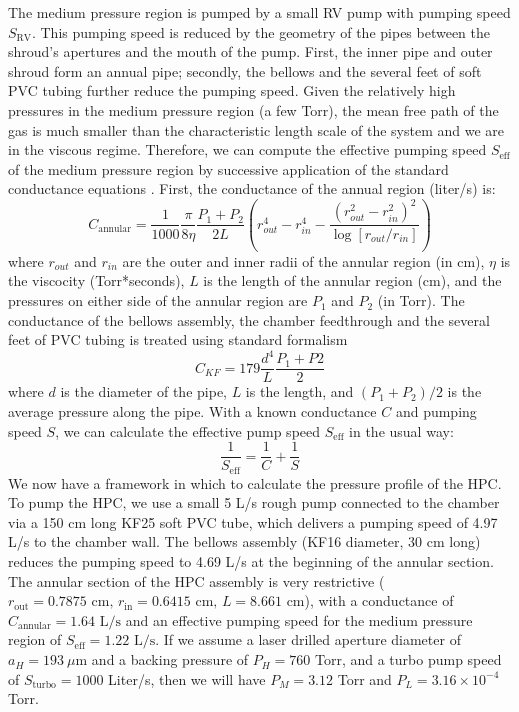 The medium pressure region is pumped by a small RV pump with pumping speed $S_{\textrm{RV}}$. This pumping speed is reduced by the geometry of the pipes between the shroud's apertures and the mouth of the pump. First, the inner pipe and outer shroud form an annual pipe; secondly, the bellows and the several feet of soft PVC tubing further reduce the pumping speed. Given the relatively high pressures in the medium pressure region (a few Torr), the mean free path of the gas is much smaller than the characteristic length scale of the system and we are in the viscous regime. Therefore, we can compute the effective pumping speed $S_{\textrm{eff}}$ of the medium pressure region by successive application of the standard conductance equations \cite{hablanianHighvacuumTechnologyPractical1997,hoffmanHandbookVacuumScience1998}. First, the conductance of the annual region (liter/s) is:
\begin{equation}
C_{\textrm{annular}} = \frac{1}{1000} \frac{\pi}{8 \eta} \frac{P_1 + P_2}{2 L} \left( r_{out}^4 - r_{in}^4 - \frac{(r_{out}^2 - r_{in}^2)^2}{\log \left[r_{out}/r_{in}\right]} \right)
\end{equation}
where $r_{out}$ and $r_{in}$ are the outer and inner radii of the annular region (in cm), $\eta$ is the viscocity (Torr*seconds), $L$ is the length of the annular region (cm), and the pressures on either side of the annular region are $P_1$ and $P_2$ (in Torr). The conductance of the bellows assembly, the chamber feedthrough and the several feet of PVC tubing is treated using standard formalism
\begin{equation}
C_{KF} = 179 \frac{d^4}{L} \frac{P_1 + P2}{2}
\end{equation}
where $d$ is the diameter of the pipe, $L$ is the length, and $(P_1 + P_2)/2$ is the average pressure along the pipe. With a known conductance $C$ and pumping speed $S$, we can calculate the effective pump speed $S_{\textrm{eff}}$ in the usual way:
\begin{equation}
\frac{1}{S_{\textrm{eff}}} = \frac{1}{C} + \frac{1}{S}
\end{equation}
We now have a framework in which to calculate the pressure profile of the HPC. To pump the HPC, we use a small 5 L/s rough pump connected to the chamber via a 150 cm long KF25 soft PVC tube, which delivers a pumping speed of 4.97 L/s to the chamber wall. The bellows assembly (KF16 diameter, 30 cm long) reduces the pumping speed to 4.69 L/s at the beginning of the annular section. The annular section of the HPC assembly is very restrictive ($r_{\textrm{out}} = 0.7875 \textrm{ cm, } r_{\textrm{in}} = 0.6415 \textrm{ cm, } L = 8.661 \textrm{ cm}$), with a conductance of $C_{\textrm{annular}} = 1.64 \textrm{ L/s}$ and an effective pumping speed for the medium pressure region of $S_{\textrm{eff}} = 1.22 \textrm{ L/s}$. If we assume a laser drilled aperture diameter of $a_H = 193 \ \mu$m and a backing pressure of $P_H = 760$ Torr, and a turbo pump speed of $S_{\textrm{turbo}} = 1000$ Liter/s, then we will have $P_M = 3.12$ Torr and $P_L = 3.16 \times 10^{-4}$ Torr.

